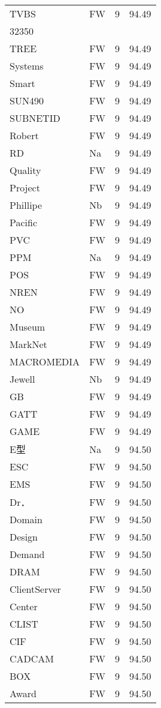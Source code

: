 \documentclass[twocolumn]{book}
\begin{document}
\begin{supertabular}{llrr}
TVBS & FW & 9 &  94.49\\
32350\\
TREE & FW & 9 &  94.49\\
Systems & FW & 9 &  94.49\\
Smart & FW & 9 &  94.49\\
SUN490 & FW & 9 &  94.49\\
SUBNETID & FW & 9 &  94.49\\
Robert & FW & 9 &  94.49\\
RD & Na & 9 &  94.49\\
Quality & FW & 9 &  94.49\\
Project & FW & 9 &  94.49\\
Phillipe & Nb & 9 &  94.49\\
Pacific & FW & 9 &  94.49\\
PVC & FW & 9 &  94.49\\
PPM & Na & 9 &  94.49\\
POS & FW & 9 &  94.49\\
NREN & FW & 9 &  94.49\\
NO & FW & 9 &  94.49\\
Museum & FW & 9 &  94.49\\
MarkNet & FW & 9 &  94.49\\
MACROMEDIA & FW & 9 &  94.49\\
Jewell & Nb & 9 &  94.49\\
GB & FW & 9 &  94.49\\
GATT & FW & 9 &  94.49\\
GAME & FW & 9 &  94.49\\
E型 & Na & 9 &  94.50\\
ESC & FW & 9 &  94.50\\
EMS & FW & 9 &  94.50\\
Dr． & FW & 9 &  94.50\\
Domain & FW & 9 &  94.50\\
Design & FW & 9 &  94.50\\
Demand & FW & 9 &  94.50\\
DRAM & FW & 9 &  94.50\\
ClientServer & FW & 9 &  94.50\\
Center & FW & 9 &  94.50\\
CLIST & FW & 9 &  94.50\\
CIF & FW & 9 &  94.50\\
CADCAM & FW & 9 &  94.50\\
BOX & FW & 9 &  94.50\\
Award & FW & 9 &  94.50\\

\end{supertabular}
\end{document}
